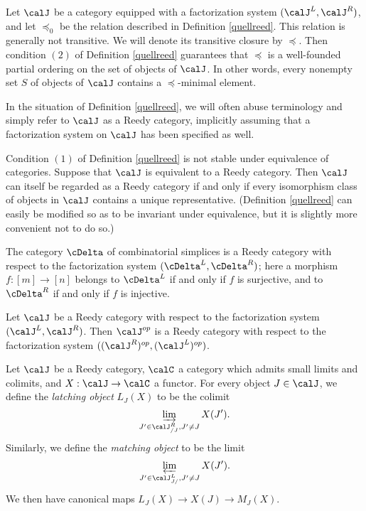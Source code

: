 \begin{Model Categories}
\begin{Didn't Read}
\begin{remark}
Let $\calJ$ be a category equipped with a factorization system $(\calJ^{L}, \calJ^{R})$, and let
$\preceq_0$ be the relation described in Definition \ref{quellreed}. This relation is generally not transitive. We will denote its transitive closure by $\preceq$. Then condition
$(2)$ of Definition \ref{quellreed} guarantees that $\preceq$ is a well-founded partial ordering on the set of objects of $\calJ$. In other words, every nonempty set $S$ of objects
of $\calJ$ contains a $\preceq$-minimal element.
\end{remark}

\begin{remark}
In the situation of Definition \ref{quellreed}, we will often abuse terminology and simply refer to $\calJ$ as a Reedy category, implicitly assuming that a factorization system on $\calJ$ has been specified as well.
\end{remark}

\begin{warning}
Condition $(1)$ of Definition \ref{quellreed} is not stable under equivalence of categories.
Suppose that $\calJ$ is equivalent to a Reedy category. Then $\calJ$ can itself be regarded as a Reedy category if and only if every isomorphism class of objects in $\calJ$ contains
a unique representative. (Definition \ref{quellreed} can easily be modified so as to be invariant under equivalence, but it is slightly more convenient not to do so.)
\end{warning}

\begin{example}\label{onep}
The category $\cDelta$ of combinatorial simplices is a Reedy category with respect to
the factorization system $( \cDelta^{L}, \cDelta^{R} )$; here a morphism
$f: [m] \rightarrow [n]$ belongs to $\cDelta^{L}$ if and only if $f$ is surjective, and
to $\cDelta^{R}$ if and only if $f$ is injective.
\end{example}

\begin{example}\label{twop}
Let $\calJ$ be a Reedy category with respect to the factorization system
$( \calJ^{L}, \calJ^{R})$. Then $\calJ^{op}$ is a Reedy category with respect to the
factorization system $( (\calJ^R)^{op}, (\calJ^{L})^{op} )$. 
\end{example}

\begin{notation}\label{bugga}
Let $\calJ$ be a Reedy category, $\calC$ a category which admits small limits and colimits, and $X: \calJ \rightarrow \calC$ a functor. For every object $J \in \calJ$, we define the
{\it latching object} $L_{J}(X)$ to be the colimit
$$ \varinjlim_{J' \in \calJ^{R}_{/J}, J' \neq J} X(J').$$
Similarly, we define the {\it matching object}
 to be the limit
$$ \varprojlim_{J' \in \calJ^{L}_{J/}, J' \neq J} X(J').$$
We then have canonical maps
$L_{J}(X) \rightarrow X(J) \rightarrow M_{J}(X).$
\end{notation}


\end{Didn't Read}
\end{Model Categories}
